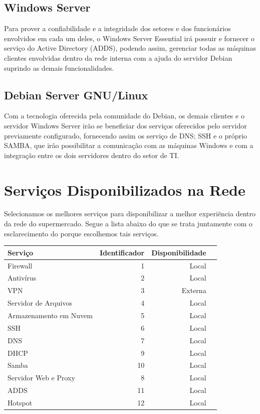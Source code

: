 \documentclass[12pt]{article}
\begin{document}
\subsection{Windows Server}
Para prover a confiabilidade e a integridade dos setores e dos funcionários envolvidos em cada um deles, o Windows Server Essential irá possuir e fornecer o serviço do Active Directory (ADDS), podendo assim, gerenciar todas as máquinas clientes envolvidas dentro da rede interna com a ajuda do servidor Debian suprindo as demais funcionalidades.
\subsection{Debian Server GNU/Linux}
Com a tecnologia oferecida pela comunidade do Debian, os demais clientes e o servidor Windows Server irão se beneficiar dos serviços oferecidos pelo servidor previamente configurado, fornecendo assim os serviço de DNS; SSH e o próprio SAMBA, que irão possibilitar a comunicação com as máquinas Windows e com a integração entre os dois servidores dentro do setor de TI.
\section{Serviços Disponibilizados na Rede}
Selecionamos os melhores serviços para disponibilizar a melhor experiẽncia dentro da rede do supermercado. Segue a lista abaixo do que se trata juntamente com o esclarecimento do porque escolhemos tais serviços.
\begin{center}
\begin{tabular}{| l | r | r | r |}
\hline
Serviço & Identificador & Disponibilidade\\
\hline
Firewall & 1 & Local\\
Antivírus & 2 & Local\\
VPN & 3 & Externa\\
Servidor de Arquivos & 4 & Local\\
Armazenamento em Nuvem & 5 & Local\\
SSH & 6 & Local\\
DNS & 7 & Local\\
DHCP & 9 & Local\\
Samba & 10 & Local\\
Servidor Web e Proxy & 8 & Local\\
ADDS & 11 & Local\\
Hotspot & 12 & Local\\
\hline
\end{tabular}
\end{center}
\end{document}
